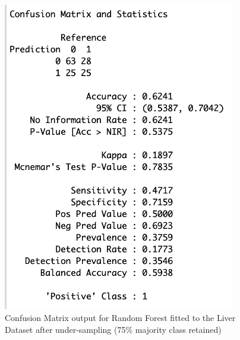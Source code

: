 \begin{figure}[!htbp]
\begin{minipage}{0.45\textwidth}
        \includegraphics[width=0.9\textwidth]{ThesisTemplate/appendix/images/Chapter5Appendix/ConfusionMatrix75/Liver.png}
        \caption{Confusion Matrix output for Random Forest fitted to the Liver Dataset after under-sampling (75\% majority class retained)}
        \label{fig:my_label}
    \end{minipage}
\end{figure}

